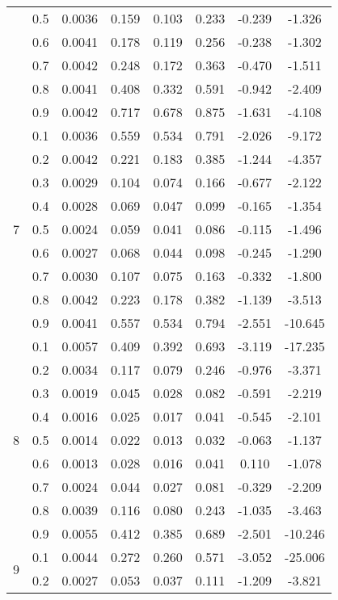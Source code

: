 \documentclass[11pt,a4paper]{report}
\begin{document}
\begin{longtable}{ | c | c || c | c | c | c | c | c | }
 & 0.5 & 0.0036 & 0.159 & 0.103 & 0.233 & -0.239 & -1.326 \\
 & 0.6 & 0.0041 & 0.178 & 0.119 & 0.256 & -0.238 & -1.302 \\
 & 0.7 & 0.0042 & 0.248 & 0.172 & 0.363 & -0.470 & -1.511 \\
 & 0.8 & 0.0041 & 0.408 & 0.332 & 0.591 & -0.942 & -2.409 \\
 & 0.9 & 0.0042 & 0.717 & 0.678 & 0.875 & -1.631 & -4.108 \\
 \hline
\multirow{9}{*}{7} & 0.1 & 0.0036 & 0.559 & 0.534 & 0.791 & -2.026 & -9.172 \\
 & 0.2 & 0.0042 & 0.221 & 0.183 & 0.385 & -1.244 & -4.357 \\
 & 0.3 & 0.0029 & 0.104 & 0.074 & 0.166 & -0.677 & -2.122 \\
 & 0.4 & 0.0028 & 0.069 & 0.047 & 0.099 & -0.165 & -1.354 \\
 & 0.5 & 0.0024 & 0.059 & 0.041 & 0.086 & -0.115 & -1.496 \\
 & 0.6 & 0.0027 & 0.068 & 0.044 & 0.098 & -0.245 & -1.290 \\
 & 0.7 & 0.0030 & 0.107 & 0.075 & 0.163 & -0.332 & -1.800 \\
 & 0.8 & 0.0042 & 0.223 & 0.178 & 0.382 & -1.139 & -3.513 \\
 & 0.9 & 0.0041 & 0.557 & 0.534 & 0.794 & -2.551 & -10.645 \\
 \hline
\multirow{9}{*}{8} & 0.1 & 0.0057 & 0.409 & 0.392 & 0.693 & -3.119 & -17.235 \\
 & 0.2 & 0.0034 & 0.117 & 0.079 & 0.246 & -0.976 & -3.371 \\
 & 0.3 & 0.0019 & 0.045 & 0.028 & 0.082 & -0.591 & -2.219 \\
 & 0.4 & 0.0016 & 0.025 & 0.017 & 0.041 & -0.545 & -2.101 \\
 & 0.5 & 0.0014 & 0.022 & 0.013 & 0.032 & -0.063 & -1.137 \\
 & 0.6 & 0.0013 & 0.028 & 0.016 & 0.041 & 0.110 & -1.078 \\
 & 0.7 & 0.0024 & 0.044 & 0.027 & 0.081 & -0.329 & -2.209 \\
 & 0.8 & 0.0039 & 0.116 & 0.080 & 0.243 & -1.035 & -3.463 \\
 & 0.9 & 0.0055 & 0.412 & 0.385 & 0.689 & -2.501 & -10.246 \\
 \hline
\multirow{9}{*}{9} & 0.1 & 0.0044 & 0.272 & 0.260 & 0.571 & -3.052 & -25.006 \\
 & 0.2 & 0.0027 & 0.053 & 0.037 & 0.111 & -1.209 & -3.821 \\

\end{longtable}
\end{document}
